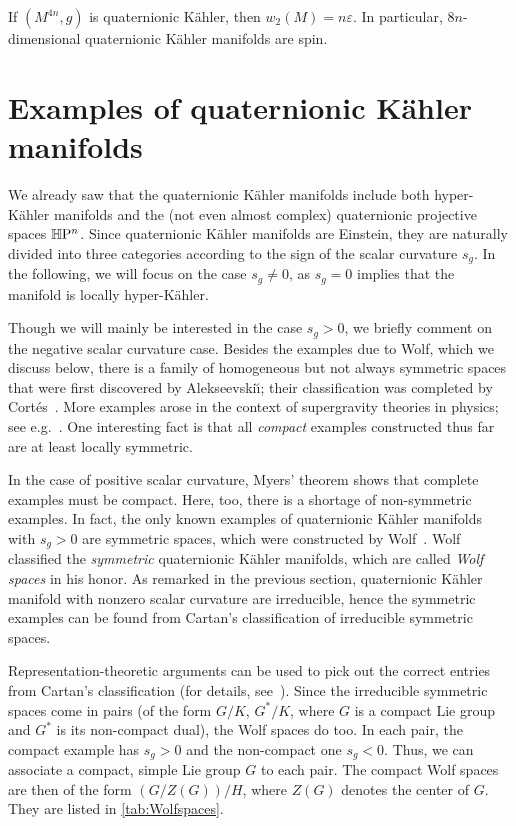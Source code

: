\begin{prop}\label{prop:QK8nspin}
	If $(M^{4n},g)$ is quaternionic K\"ahler, then $w_2(M)=n\varepsilon$. In particular, $8n$-dimensional quaternionic K\"ahler manifolds are spin.
\end{prop}

\section{Examples of quaternionic K\"ahler manifolds}

We already saw that the quaternionic K\"ahler manifolds include both hyper-K\"ahler manifolds and the (not even almost complex) quaternionic projective spaces $\mathbb{H}\mathrm{P}^n$. Since quaternionic K\"ahler manifolds are Einstein, they are naturally divided into three categories according to the sign of the scalar curvature $s_g$. In the following, we will focus on the case $s_g\neq 0$, as $s_g=0$ implies that the manifold is locally hyper-K\"ahler.

Though we will mainly be interested in the case $s_g>0$, we briefly comment on the negative scalar curvature case. Besides the examples due to Wolf, which we discuss below, there is a family of homogeneous but not always symmetric spaces that were first discovered by Alekseevski\u\i; their classification was completed by Cort\'es~\cite{Cor1996}. More examples arose in the context of supergravity theories in physics; see e.g.~\cite{ACDM2015,Cor2010}. One interesting fact is that all \emph{compact} examples constructed thus far are at least locally symmetric.

In the case of positive scalar curvature, Myers' theorem shows that complete examples must be compact. Here, too, there is a shortage of non-symmetric examples. In fact, the only known examples of quaternionic K\"ahler manifolds with $s_g>0$ are symmetric spaces, which were constructed by Wolf~\cite{Wol1965}. Wolf classified the \emph{symmetric} quaternionic K\"ahler manifolds, which are called \emph{Wolf spaces} in his honor. As remarked in the previous section, quaternionic K\"ahler manifold with nonzero scalar curvature are irreducible, hence the symmetric examples can be found from Cartan's classification of irreducible symmetric spaces. 

Representation-theoretic arguments can be used to pick out the correct entries from Cartan's classification (for details, see~\cite[\nopp \S 14.50]{Bes2008}). Since the irreducible symmetric spaces come in pairs (of the form $G/K$, $G^*/K$, where $G$ is a compact Lie group and $G^*$ is its non-compact dual), the Wolf spaces do too. In each pair, the compact example has $s_g>0$ and the non-compact one $s_g<0$. Thus, we can associate a compact, simple Lie group $G$ to each pair. The compact  Wolf spaces are then of the form $(G/Z(G))/H$, where $Z(G)$ denotes the center of $G$. They are listed in \cref{tab:Wolfspaces}.

